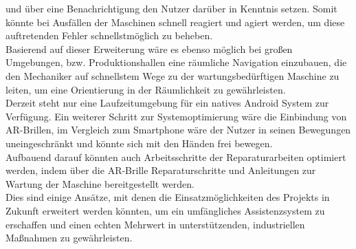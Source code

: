 und über eine Benachrichtigung den Nutzer darüber in Kenntnis setzen. Somit könnte bei Ausfällen der Maschinen schnell reagiert und agiert werden, um diese auftretenden 
Fehler schnellstmöglich zu beheben. 
\\ 
Basierend auf dieser Erweiterung wäre es ebenso möglich bei großen Umgebungen, bzw. Produktionshallen eine räumliche Navigation einzubauen, die den Mechaniker auf 
schnellstem Wege zu der wartungsbedürftigen Maschine zu leiten, um eine Orientierung in der Räumlichkeit zu gewährleisten. 
\\ 
\linebreak
Derzeit steht nur eine Laufzeitumgebung für ein natives Android System zur Verfügung. Ein weiterer Schritt zur Systemoptimierung wäre die Einbindung von \acs{AR}-Brillen, 
im Vergleich zum Smartphone wäre der Nutzer in seinen Bewegungen uneingeschränkt und könnte sich mit den Händen frei bewegen. 
\\ 
Aufbauend darauf könnten auch Arbeitsschritte der Reparaturarbeiten optimiert werden, indem über die \acs{AR}-Brille Reparaturschritte und Anleitungen zur Wartung der 
Maschine bereitgestellt werden. 
\\ 
\linebreak
Dies sind einige Ansätze, mit denen die Einsatzmöglichkeiten des Projekts in Zukunft erweitert werden könnten, um ein umfängliches Assistenzsystem zu erschaffen und einen 
echten Mehrwert in unterstützenden, industriellen Maßnahmen zu gewährleisten.  
